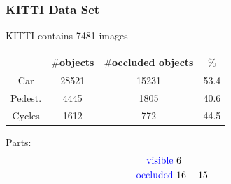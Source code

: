 \documentclass[xcolor=dvipsnames]{beamer}
\begin{document}
\begin{frame}
	\frametitle{KITTI Data Set}
	\Large
	\begin{center}
		KITTI contains 7481 images
	\end{center}
	\begin{tabular}{c|c|c|c}
		& $\#$objects & $\#$occluded objects & $\%$ \\
		\hline
		Car & 28521 & 15231 & 53.4 \\
		Pedest. & 4445 & 1805 & 40.6 \\
		Cycles & 1612 & 772 & 44.5 \\
	\end{tabular}
	\vspace{1cm}

	Parts: 
		\begin{align*}
			\text{\textcolor{blue}{visible} } & 6 \\
			\text{\textcolor{blue}{occluded} } & 16-15 &&\\
		\end{align*}
\end{frame}
\end{document}
